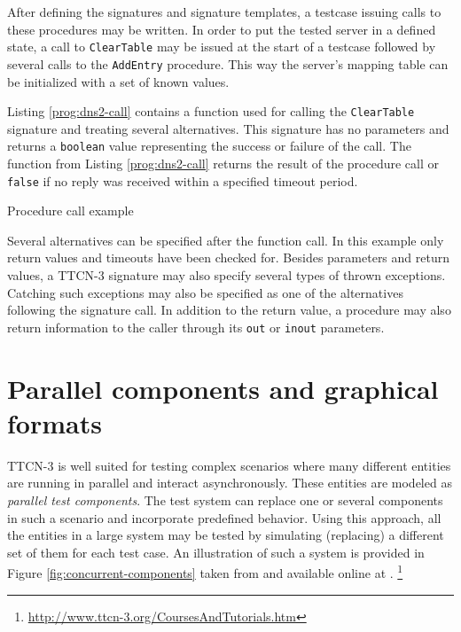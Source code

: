 After defining the signatures and signature templates,
a testcase issuing calls to these procedures may be written.
In order to put the tested server in a defined state,
a call to \verb=ClearTable= may be issued at the start of a testcase
followed by several calls to the \verb=AddEntry= procedure.
This way the server's mapping table can be initialized
with a set of known values.

Listing \ref{prog:dns2-call} contains a function
used for calling the \verb=ClearTable= signature
and treating several alternatives.
This signature has no parameters and returns a \verb=boolean= value
representing the success or failure of the call.
The function from Listing \ref{prog:dns2-call} returns
the result of the procedure call
or \verb=false= if no reply was received within a specified timeout period.

\begin{program}
\caption{Procedure call example\label{prog:dns2-call}}
\end{program}

Several alternatives can be specified after the function call.
In this example only return values and timeouts have been checked for.
Besides parameters and return values, a \ac{TTCN-3} signature may also specify
several types of thrown exceptions.
Catching such exceptions may also be specified
as one of the alternatives following the signature call.
In addition to the return value,
a procedure may also return information to the caller
through its \verb=out= or \verb=inout= parameters.


\section{Parallel components and graphical formats}

\ac{TTCN-3} is well suited for testing complex scenarios
where many different entities are running in parallel
and interact asynchronously.
These entities are modeled as \emph{parallel test components}.
The test system can replace one or several components in such a scenario
and incorporate predefined behavior.
Using this approach, all the entities in a large system may be tested
by simulating (replacing) a different set of them for each test case.
An illustration of such a system is provided in
Figure \ref{fig:concurrent-components}
taken from \citep{ttcn3-uc-2007-managing-concurrency}
and available online at \citep{website:ttcn3.org}.%
\footnote{\url{http://www.ttcn-3.org/CoursesAndTutorials.htm}}

